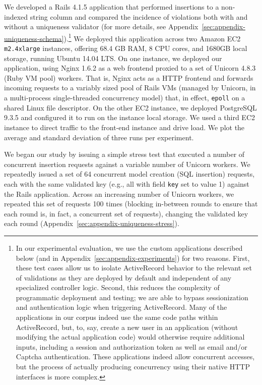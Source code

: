  We developed a Rails 4.1.5 application
that performed insertions to a non-indexed string column and compared
the incidence of violations both with and without a uniqueness
validator (for more details, see
Appendix~\ref{sec:appendix-uniqueness-schema}).\footnote{In our
  experimental evaluation, we use the custom applications described
  below (and in Appendix~\ref{sec:appendix-experiments}) for two
  reasons. First, these test cases allow us to isolate ActiveRecord
  behavior to the relevant set of validations as they are deployed by
  default and independent of any specialized controller logic. Second,
  this reduces the complexity of programmatic deployment and testing;
  we are able to bypass sessionization and authentication logic when
  triggering ActiveRecord. Many of the applications in our corpus
  indeed use the same code paths within ActiveRecord, but, to, say,
  create a new user in an application (without modifying the actual
  application code) would otherwise require additional inputs,
  including a session and authorization token as well as email and/or
  Captcha authentication. These applications indeed allow concurrent
  accesses, but the process of actually producing concurrency using
  their native HTTP interfaces is more complex.} We deployed this
application across two Amazon EC2 \texttt{m2.4xlarge} instances,
offering 68.4 GB RAM, 8 CPU cores, and 1680GB local storage, running
Ubuntu 14.04 LTS. On one instance, we deployed our application, using
Nginx 1.6.2 as a web frontend proxied to a set of Unicorn 4.8.3 (Ruby
VM pool) workers. That is, Nginx acts as a HTTP frontend and forwards
incoming requests to a variably sized pool of Rails VMs (managed by
Unicorn, in a multi-process single-threaded concurrency model) that,
in effect, \texttt{epoll} on a shared Linux file descriptor. On the
other EC2 instance, we deployed PostgreSQL 9.3.5 and configured it to
run on the instance local storage. We used a third EC2 instance to
direct traffic to the front-end instance and drive load. We plot the
average and standard deviation of three runs per experiment.

 We began our study by issuing a simple stress
test that executed a number of concurrent insertion requests against a
variable number of Unicorn workers. We repeatedly issued a set of 64
concurrent model creation (SQL insertion) requests, each with the same
validated key (e.g., all with field \texttt{key} set to value 1)
against the Rails application. Across an increasing number of Unicorn
workers, we repeated this set of requests 100 times (blocking
in-between rounds to ensure that each round is, in fact, a concurrent
set of requests), changing the validated key each round
(Appendix~\ref{sec:appendix-uniqueness-stress}).

